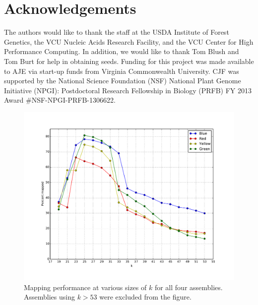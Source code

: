 \documentclass[11pt]{article}
\begin{document}
\section*{Acknowledgements}

The authors would like to thank the staff at the USDA Institute of Forest Genetics, the 
VCU Nucleic Acids Research Facility, and the VCU Center for High Performance Computing. 
In addition, we would like to thank Tom Blush and Tom Burt for help in obtaining 
seeds. Funding for this project was made available to AJE via start-up funds from Virginia 
Commonwealth University. CJF was supported by the National Science Foundation (NSF) National Plant Genome 
Initiative (NPGI): Postdoctoral Research Fellowship in Biology (PRFB) FY 2013 Award \#NSF-NPGI-PRFB-1306622.

\clearpage

\singlespacing



\clearpage

\begin{figure}[t]
\centering
\includegraphics[width=1.0\textwidth]{mapping_performance}
\caption{Mapping performance at various sizes of $k$ for all four assemblies.  Assemblies using 
$k>53$ were excluded from the figure.}
\label{f:mapping_performance}
\end{figure}
\end{document}
